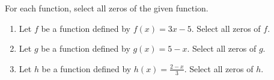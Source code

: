 \documentclass{ximera}
\author{Kenneth Berglund}
\begin{document}
\licenseSZ
\begin{exercise}
For each function, select all zeros of the given function.
\begin{enumerate}
\item Let $f$ be a function defined by $f(x) = 3x - 5$.
Select all zeros of $f$.
\begin{selectAll}
\end{selectAll}

\item Let $g$ be a function defined by $g(x) = 5 - x$.
Select all zeros of $g$.
\begin{selectAll}
\end{selectAll}

\item Let $h$ be a function defined by $h(x) = \frac{2 - x}{3}$.
Select all zeros of $h$.
\begin{selectAll}
\end{selectAll}

\end{enumerate}

\end{exercise}
\end{document}
